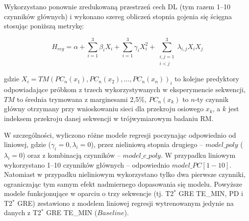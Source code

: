 Wykorzystano ponownie zredukowaną przestrzeń cech DL (tym razem 1--10 czynników głównych) i wykonano szereg obliczeń stopnia gojenia się ścięgna stosując poniższą metrykę: 

\begin{equation}
H_{reg} = \alpha + \sum_{i=1}^{3}\beta_{i}X_{i} + \sum_{i=1}^{3}\gamma_{i}X_{i}^{2} +
\sum_{\substack{i, j = 1\\ i < j}}^{3}\lambda_{i,j}X_{i}X_{j}
\end{equation}

gdzie $X_i = TM(PC_n(x_1), PC_n(x_2),..., PC_n(x_n))_{i}$ to kolejne predyktory odpowiadające próbkom z trzech wykorzystywanych w eksperymencie sekwencji, $TM$ \linebreak to średnia trymowana z marginesami 2,5\%, $PC_n(x_k)$ to $n$-ty czynnik główny otrzymany przy wnioskowaniu sieci dla przekroju osiowego $x_k$, a $k$ jest indeksem przekroju danej sekwencji w trójwymiarowym badaniu RM.

W szczególności, wyliczono różne modele regresji poczynając odpowiednio od liniowej, gdzie ($\gamma_{i}=0, \lambda_{i}=0$), przez nieliniową stopnia drugiego -- $model\_poly$ ($\lambda_{i}=0$) oraz z kombinacją czynników -- $model\_c\_poly$. W przypadku liniowym wykorzystano 1--10 czynników głównych -- odpowiednio $model\_PC[1-10]$. Natomiast w przypadku nieliniowym wykorzystano tylko dwa pierwsze czynniki, ograniczając tym samym efekt nadmiernego dopasowania się modelu. Powyższe modele funkcjonujące w oparciu o trzy sekwencje (tj. T2$^\ast$ GRE TE\_MIN, PD i T2$^\ast$ GRE) zestawiono z modelem liniowej regresji wytrenowanym jedynie na danych z T2$^\ast$ GRE TE\_MIN ($Baseline$). 

